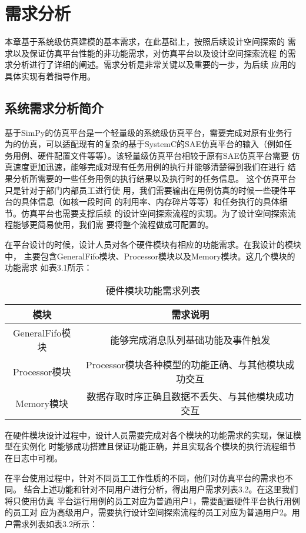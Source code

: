 
\chapter{需求分析}
本章基于系统级仿真建模的基本需求，在此基础上，按照后续设计空间探索的
需求以及保证仿真平台性能的非功能需求，对仿真平台以及设计空间探索流程
的需求分析进行了详细的阐述。需求分析是非常关键以及重要的一步，为后续
应用的具体实现有着指导作用。

\section{系统需求分析简介}
基于SimPy的仿真平台是一个轻量级的系统级仿真平台，需要完成对原有业务行
为的仿真，可以适配现有的复杂的基于SystemC的SAE仿真平台的输入（例如任
务用例、硬件配置文件等等）。该轻量级仿真平台相较于原有SAE仿真平台需要
仿真速度更加迅速，能够完成对现有任务用例的执行并能够清楚得到我们在进行
结果分析所需要的一些任务用例的执行结果以及执行时的任务信息。
这个仿真平台只是针对于部门内部员工进行使
用，我们需要输出在用例仿真的时候一些硬件平台的具体信息（如核一段时间
的利用率、内存碎片等等）和任务执行的具体细节。仿真平台也需要支撑后续
的设计空间探索流程的实现。为了设计空间探索流程能够更简易使用，我们需
要将整个流程做成可配置的。

在平台设计的时候，设计人员对各个硬件模块有相应的功能需求。在我设计的模块中，
主要包含GeneralFifo模块、Processor模块以及Memory模块。这几个模块的功能需求
如表3.1所示：
\begin{table}[]
    \centering\normalsize
    \caption{硬件模块功能需求列表}
    \begin{tabular}{|c|c|}
    \hline
    模块            & 需求说明                           \\ \hline
    GeneralFifo模块 & 能够完成消息队列基础功能及事件触发              \\ \hline
    Processor模块   & Processor模块各种模型的功能正确、与其他模块成功交互 \\ \hline
    Memory模块      & 数据存取时序正确且数据不丢失、与其他模块成功交互       \\ \hline
    \end{tabular}
    \end{table}

在硬件模块设计过程中，设计人员需要完成对各个模块的功能需求的实现，保证模型在实例化
时能够成功搭建且保证功能正确，并且实现各个模块的执行流程细节在日志中可视。

在平台使用过程中，针对不同员工工作性质的不同，他们对仿真平台的需求也不同。
结合上述功能和针对不同用户进行分析，得出用户需求列表3.2。在这里我们将只使用仿真
平台运行用例的员工对应为普通用户1，需要配置硬件平台执行用例的员工对
应为高级用户，需要执行设计空间探索流程的员工对应为普通用户2。用户需求列表如表3.2所示：

